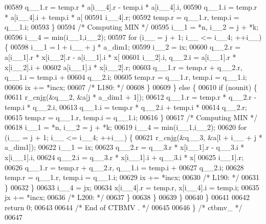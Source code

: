 \begin{DoxyCode}
00589                 q\_\_1.r = temp.r * a[i\_\_4].r - temp.i * a[i\_\_4].i, 
00590                     q\_\_1.i = temp.r * a[i\_\_4].i + temp.i * a[
00591                     i\_\_4].r;
00592                 temp.r = q\_\_1.r, temp.i = q\_\_1.i;
00593             \}
00594 \textcolor{comment}{/* Computing MIN */}
00595             i\_\_1 = *n, i\_\_2 = j + *k;
00596             i\_\_4 = min(i\_\_1,i\_\_2);
00597             \textcolor{keywordflow}{for} (i\_\_ = j + 1; i\_\_ <= i\_\_4; ++i\_\_) \{
00598                 i\_\_1 = l + i\_\_ + j * a\_dim1;
00599                 i\_\_2 = ix;
00600                 q\_\_2.r = a[i\_\_1].r * x[i\_\_2].r - a[i\_\_1].i * x[
00601                     i\_\_2].i, q\_\_2.i = a[i\_\_1].r * x[i\_\_2].i + 
00602                     a[i\_\_1].i * x[i\_\_2].r;
00603                 q\_\_1.r = temp.r + q\_\_2.r, q\_\_1.i = temp.i + 
00604                     q\_\_2.i;
00605                 temp.r = q\_\_1.r, temp.i = q\_\_1.i;
00606                 ix += *incx;
00607 \textcolor{comment}{/* L180: */}
00608             \}
00609             \} \textcolor{keywordflow}{else} \{
00610             \textcolor{keywordflow}{if} (nounit) \{
00611                 r\_cnjg(&q\_\_2, &a[j * a\_dim1 + 1]);
00612                 q\_\_1.r = temp.r * q\_\_2.r - temp.i * q\_\_2.i, 
00613                     q\_\_1.i = temp.r * q\_\_2.i + temp.i * 
00614                     q\_\_2.r;
00615                 temp.r = q\_\_1.r, temp.i = q\_\_1.i;
00616             \}
00617 \textcolor{comment}{/* Computing MIN */}
00618             i\_\_1 = *n, i\_\_2 = j + *k;
00619             i\_\_4 = min(i\_\_1,i\_\_2);
00620             \textcolor{keywordflow}{for} (i\_\_ = j + 1; i\_\_ <= i\_\_4; ++i\_\_) \{
00621                 r\_cnjg(&q\_\_3, &a[l + i\_\_ + j * a\_dim1]);
00622                 i\_\_1 = ix;
00623                 q\_\_2.r = q\_\_3.r * x[i\_\_1].r - q\_\_3.i * x[i\_\_1].i, 
00624                     q\_\_2.i = q\_\_3.r * x[i\_\_1].i + q\_\_3.i * x[
00625                     i\_\_1].r;
00626                 q\_\_1.r = temp.r + q\_\_2.r, q\_\_1.i = temp.i + 
00627                     q\_\_2.i;
00628                 temp.r = q\_\_1.r, temp.i = q\_\_1.i;
00629                 ix += *incx;
00630 \textcolor{comment}{/* L190: */}
00631             \}
00632             \}
00633             i\_\_4 = jx;
00634             x[i\_\_4].r = temp.r, x[i\_\_4].i = temp.i;
00635             jx += *incx;
00636 \textcolor{comment}{/* L200: */}
00637         \}
00638         \}
00639     \}
00640     \}
00641 
00642     \textcolor{keywordflow}{return} 0;
00643 
00644 \textcolor{comment}{/*     End of CTBMV . */}
00645 
00646 \} \textcolor{comment}{/* ctbmv\_ */}
00647 
\end{DoxyCode}

